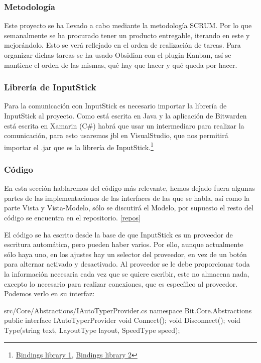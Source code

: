 \subsubsection{Metodología}
Este proyecto se ha llevado a cabo mediante la metodología SCRUM. Por lo que semanalmente se ha procurado tener un producto entregable, iterando en este y mejorándolo. Esto se verá reflejado en el orden de realización de tareas. Para organizar dichas tareas se ha usado Obsidian con el plugin Kanban, así se mantiene el orden de las mismas, qué hay que hacer y qué queda por hacer.

\subsubsection{Librería de InputStick}
Para la comunicación con InputStick es necesario importar la librería de InputStick\cite{sticklibrary} al proyecto. Como está escrita en Java y la aplicación de Bitwarden está escrita en Xamarin (C\#) habrá que usar un intermediaro para realizar la comunicación, para esto usaremos \gls{jbl}\cite{bindingjar} en VisualStudio, que nos permitirá importar el .jar que es la librería de InputStick.\footnote{\href{https://github.com/PabloOQ/mobile/commit/40e370ec8dcce3fb693363a26eb971239fb9728a}{Bindings library 1}, \href{https://github.com/PabloOQ/mobile/commit/d6cccb783599da01ed99baa2ad924bea75dbf7d9}{Bindings library 2}}

\subsubsection{Código}
En esta sección hablaremos del código más relevante, hemos dejado fuera algunas partes de las implementaciones de las interfaces de las que se habla, así como la parte Vista y Vista-Modelo, sólo se discutirá el Modelo, por supuesto el resto del código se encuentra en el repositorio. \ref{repos}

El código se ha escrito desde la base de que InputStick es un proveedor de escritura automática, pero pueden haber varios. Por ello, aunque actualmente sólo haya uno, en los ajustes hay un selector del proveedor, en vez de un botón para alternar activado y desactivado. Al proveedor se le debe proporcionar toda la información necesaria cada vez que se quiere escribir, este no almacena nada, excepto lo necesario para realizar conexiones, que es específico al proveedor. Podemos verlo en su interfaz:
\begin{csharp}[firstnumber=6]{src/Core/Abstractions/IAutoTyperProvider.cs}
namespace Bit.Core.Abstractions
{
    public interface IAutoTyperProvider
    {
        void Connect();
        void Disconnect();
        void Type(string text, LayoutType layout, SpeedType speed);
    }
}
\end{csharp}

